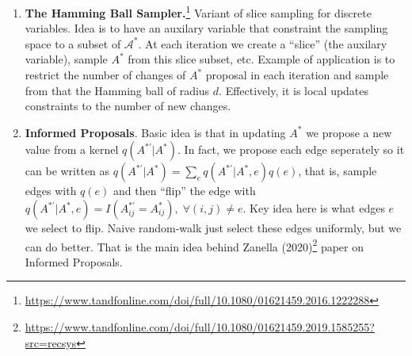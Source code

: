 \documentclass[12pt]{article}
\begin{document}
\begin{enumerate}
    \item \textbf{The Hamming Ball Sampler.}\footnote{ \url{https://www.tandfonline.com/doi/full/10.1080/01621459.2016.1222288}}
            Variant of slice sampling for discrete variables.
            Idea is to have an auxilary variable that constraint the sampling space 
            to a subset of $\mathcal{A}^\ast$. At each iteration we create a ``slice'' 
            (the auxilary variable), sample $A^\ast$ from this slice subset, etc.
            Example of application is to restrict the number of changes of $A^\ast$
            proposal in each iteration and sample from that the Hamming ball of radius $d$.
            Effectively, it is local updates constraints to the number of new changes.
            

    \item \textbf{Informed Proposals}. Basic idea is that in updating $A^\ast$ 
            we propose a new value from a kernel $q(A^{\ast'} \vert A^\ast)$. 
            In fact, we propose each edge seperately so it can be written as 
            $q(A^{\ast'} \vert A^\ast) = \sum_{e} q(A^{\ast'} \vert A^\ast,e)q(e)$, that is, 
            sample edges with $q(e)$ and then ``flip'' the edge with 
            $q(A^{\ast'} \vert A^\ast,e) = I(A^{\ast'}_{ij}=A^\ast_{ij}), \; \forall (i,j)\neq e$.
            Key idea here is what edges $e$ we select to flip. 
            Naive random-walk just select these edges uniformly, but we can do better.
            That is the main idea behind Zanella (2020)\footnote{\url{https://www.tandfonline.com/doi/full/10.1080/01621459.2019.1585255?src=recsys}}
            paper on Informed Proposals.
             

\end{enumerate}
\end{document}
